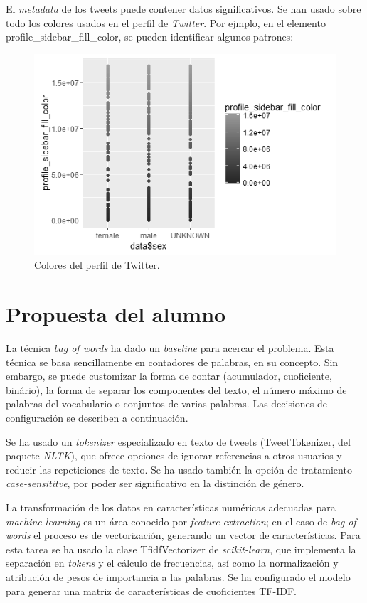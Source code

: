 \documentclass[11pt,a4paper]{article}
\begin{document}
  El {\em metadata} de los tweets puede contener datos significativos. Se han usado sobre todo los colores usados en el perfil de {\em Twitter}. Por ejmplo, en el elemento {\ttfamily profile\_sidebar\_fill\_color}, se pueden identificar algunos patrones:
   
  \begin{figure}[ht!]
    \includegraphics[width=\linewidth]{profile_colors.png}
    \caption{Colores del perfil de Twitter.}
    \label{fig:profile_colors}
  \end{figure}
  

\section{Propuesta del alumno}

  La t\'ecnica {\em bag of words} ha dado un {\em baseline} para acercar el problema. Esta t\'ecnica se basa sencillamente en contadores de palabras, en su concepto. Sin embargo, se puede customizar la forma de contar (acumulador, cuoficiente, bin\'ario), la forma de separar los componentes del texto, el n\'umero m\'aximo de palabras del vocabulario o conjuntos de varias palabras. Las decisiones de configuraci\'on se describen a continuaci\'on.

  Se ha usado un {\em tokenizer} especializado en texto de tweets ({\ttfamily TweetTokenizer}, del paquete {\em NLTK}), que ofrece opciones de ignorar referencias a otros usuarios y reducir las repeticiones de texto. Se ha usado tambi\'en la opci\'on de tratamiento {\em case-sensititve}, por poder ser significativo en la distinci\'on de g\'enero.

  La transformaci\'on de los datos en caracter\'isticas num\'ericas adecuadas para {\em machine learning} es un \'area conocido por {\em feature extraction}; en el caso de {\em bag of words} el proceso es de vectorizaci\'on, generando un vector de caracter\'isticas. Para esta tarea se ha usado la clase {\ttfamily TfidfVectorizer} de {\em scikit-learn}, que implementa la separaci\'on en {\em tokens} y el c\'alculo de frecuencias, así como la normalizaci\'on y atribuci\'on de pesos de importancia a las palabras. Se ha configurado el modelo para generar una matriz de caracter\'isticas de cuoficientes TF-IDF.
\end{document}
